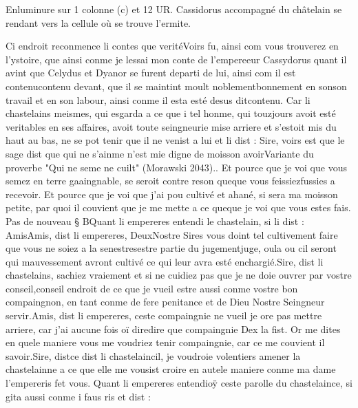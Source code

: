 \documentclass{article}
\begin{document}
\begin{pages}
               Enluminure sur 1 colonne (c) et 12 UR.
                  Cassidorus accompagné du châtelain 
                  se rendant vers la cellule où se trouve l’ermite.
               
            
\pstart Ci endroit reconmence 
   li contes que veritéVoirs fu, 
   ainsi com vous trouverez en l’ystoire, que ainsi conme je lessai mon conte de l’empereeur 
   Cassydorus quant il avint que Celydus 
   et Dyanor se furent departi de lui, ainsi com il est 
      contenucontenu devant, 
   que il se maintint moult noblementbonnement en 
   sonson travail et en son labour, ainsi conme il 
      esta esté desus 
      ditcontenu. 
   Car li chastelains meismes, qui esgarda a ce que i tel honme, 
   qui touzjours avoit esté veritables en ses affaires, avoit toute seingneurie mise arriere et s’estoit mis du haut au bas, 
   ne se pot tenir que il ne venist a lui et li dist :
   Sire, voirs est que le sage dist que qui ne s’ainme n’est mie digne de moisson 
      avoirVariante du proverbe "Qui ne seme ne cuilt" (Morawski 2043).. Et pource que je voi que vous semez en terre gaaingnable, se seroit contre reson 
      queque vous 
      feissiezfussies a recevoir. Et pource que je voi que j’ai pou cultivé et ahané, si sera ma moisson petite, 
      par quoi il couvient que je me mette a ce queque je voi que 
      vous estes fais. \pend
            \pstart Pas de nouveau § BQuant 
   li empereres entendi le chastelain, 
               si li dist :
   AmisAmis, dist li empereres, 
      DeuxNostre Sires vous doint tel cultivement faire que vous ne soiez a 
      la senestresestre partie du 
      jugementjuge, 
      oula ou cil seront qui mauvessement avront cultivé ce qui leur avra 
      esté enchargié.Sire, dist li chastelains, sachiez vraiement 
      et si ne cuidiez pas que je ne doie ouvrer par vostre conseil,conseil
      endroit de ce que je vueil estre aussi conme vostre bon compaingnon, 
   en tant conme de fere penitance et de Dieu Nostre Seingneur servir.Amis, dist li empereres, ceste compaingnie ne vueil je ore 
      pas mettre arriere, car j’ai aucune fois oï diredire que compaingnie 
      Dex la fist. Or me dites en quele maniere vous me voudriez tenir compaingnie, car ce me couvient il savoir.Sire, distce dist 
      li chastelaincil, je voudroie 
      volentiers amener la chastelainne a ce que elle me vousist croire en autele maniere conme 
      ma dame l’empereris fet 
      vous. \pend
\pstart Quant li empereres 
   entendioÿ 
   ceste parolle du chastelaince, 
   si gita aussi conme i faus ris et dist :

\end{pages}
\end{document}
